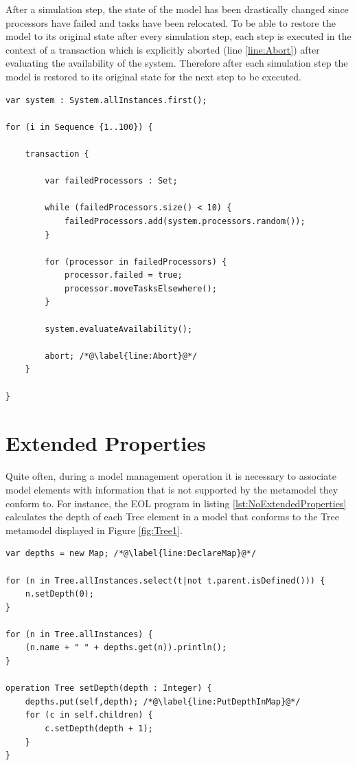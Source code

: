 After a simulation step, the state of the model has been drastically changed since processors have failed and tasks have been relocated. To be able to restore the model to its original state after every simulation step, each step is executed in the context of a transaction which is explicitly aborted (line \ref{line:Abort}) after evaluating the availability of the system. Therefore after each simulation step the model is restored to its original state for the next step to be executed.

\begin{lstlisting}[basicstyle=\ttfamily\footnotesize, flexiblecolumns=true, numbers=none, nolol=true, caption=Example of a for statement, label=lst:TransactionStatement, numbers=left, language=EOL, tabsize=2]
var system : System.allInstances.first();

for (i in Sequence {1..100}) {

	transaction {
		
		var failedProcessors : Set; 
		
		while (failedProcessors.size() < 10) {
			failedProcessors.add(system.processors.random());
		}
		
		for (processor in failedProcessors) {
			processor.failed = true;
			processor.moveTasksElsewhere();
		}
		
		system.evaluateAvailability();
		
		abort; /*@\label{line:Abort}@*/
	}
	
}
\end{lstlisting}

\section{Extended Properties}
\label{sec:ExtendedProperties}

Quite often, during a model management operation it is necessary to associate model elements with information that is not supported by the metamodel they conform to. For instance, the EOL program in listing \ref{lst:NoExtendedProperties} calculates the depth of each Tree element in a model that conforms to the Tree metamodel displayed in Figure \ref{fig:Tree1}.


\begin{lstlisting}[basicstyle=\ttfamily\footnotesize, flexiblecolumns=true, numbers=none, nolol=true, caption=Calculating and printing the depth of each Tree, label=lst:NoExtendedProperties, numbers=left, language=EOL, tabsize=2]
var depths = new Map; /*@\label{line:DeclareMap}@*/

for (n in Tree.allInstances.select(t|not t.parent.isDefined())) {
	n.setDepth(0);
}

for (n in Tree.allInstances) {
	(n.name + " " + depths.get(n)).println();
}

operation Tree setDepth(depth : Integer) {
	depths.put(self,depth); /*@\label{line:PutDepthInMap}@*/
	for (c in self.children) {
		c.setDepth(depth + 1);
	}
}
\end{lstlisting}


